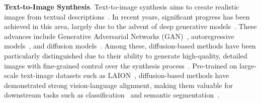 


\textbf{Text-to-Image Synthesis}.
Text-to-image synthesis aims to create realistic images from textual descriptions~\citep{zhu2019dm, ge2023expressive}.
In recent years, significant progress has been achieved in this area, largely due to the advent of deep generative models~\citep{zhan2023multimodal, goodfellow2014generative}. 
These advances include Generative Adversarial Networks (GAN)~\citep{sauer2023stylegan, kang2023scaling}, autoregressive models~\citep{chang2023muse, yu2022scaling}, and diffusion models~\citep{ho2020denoising,karras2022elucidating,nichol2022glide,saharia2022photorealistic, rombach2021highresolution}.
Among these, diffusion-based methods have been particularly distinguished due to their ability to generate high-quality, detailed images with fine-grained control over the synthesis process~\citep{yang2023diffusion,croitoru2023diffusion}.
Pre-trained on large-scale text-image datasets such as LAION~\citep{schuhmann2022laion}, diffusion-based methods have demonstrated strong vision-language alignment, making them valuable for downstream tasks such as classification~\citep{li2023your} and semantic segmentation~\citep{amit2021segdiff, wolleb2022diffusion}. 

